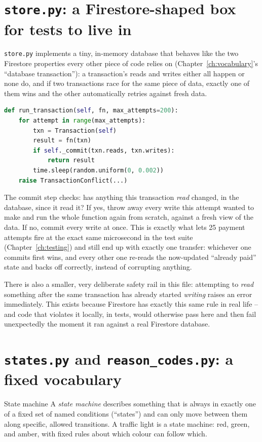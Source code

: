 \documentclass[11pt]{report}
\newcommand{\file}[1]{\texttt{#1}}
\begin{document}
\section{\file{store.py}: a Firestore-shaped box for tests to live in}

\file{store.py} implements a tiny, in-memory database that behaves like
the two Firestore properties every other piece of code relies on
(Chapter~\ref{ch:vocabulary}'s ``database transaction''): a transaction's
reads and writes either all happen or none do, and if two transactions
race for the same piece of data, exactly one of them wins and the other
automatically retries against fresh data.

\begin{lstlisting}[language=Python]
def run_transaction(self, fn, max_attempts=200):
    for attempt in range(max_attempts):
        txn = Transaction(self)
        result = fn(txn)
        if self._commit(txn.reads, txn.writes):
            return result
        time.sleep(random.uniform(0, 0.002))
    raise TransactionConflict(...)
\end{lstlisting}

The commit step checks: has anything this transaction \emph{read}
changed, in the database, since it read it? If yes, throw away every
write this attempt wanted to make and run the whole function again from
scratch, against a fresh view of the data. If no, commit every write at
once. This is exactly what lets 25 payment attempts fire at the exact
same microsecond in the test suite (Chapter~\ref{ch:testing}) and still
end up with exactly one transfer: whichever one commits first wins, and
every other one re-reads the now-updated ``already paid'' state and backs
off correctly, instead of corrupting anything.

There is also a smaller, very deliberate safety rail in this file:
attempting to \emph{read} something after the same transaction has
already started \emph{writing} raises an error immediately. This exists
because Firestore has exactly this same rule in real life -- and code
that violates it locally, in tests, would otherwise pass here and then
fail unexpectedly the moment it ran against a real Firestore database.

\section{\file{states.py} and \file{reason\_codes.py}: a fixed vocabulary}

\begin{concept}{State machine}
A \emph{state machine} describes something that is always in exactly one
of a fixed set of named conditions (``states'') and can only move between
them along specific, allowed transitions. A traffic light is a state
machine: red, green, and amber, with fixed rules about which colour can
follow which.
\end{concept}
\end{document}
